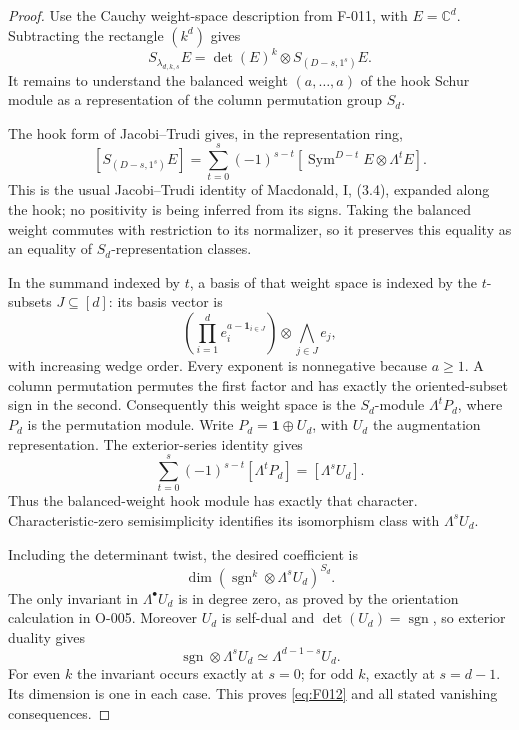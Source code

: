 \begin{proof}
Use the Cauchy weight-space description from F-011, with
\(E=\mathbb C^d\). Subtracting the rectangle \((k^d)\) gives
\[
 S_{\lambda_{d,k,s}}E
       =\det(E)^k\otimes S_{(D-s,1^s)}E.
\]
It remains to understand the balanced weight \((a,\ldots,a)\)
of the hook Schur module as a representation of the column
permutation group \(S_d\).

The hook form of Jacobi--Trudi gives, in the representation ring,
\[
 [S_{(D-s,1^s)}E]
    =\sum_{t=0}^{s}(-1)^{s-t}
       [\operatorname{Sym}^{D-t}E\otimes\Lambda^t E].
\]
This is the usual Jacobi--Trudi identity of Macdonald, I, (3.4),
expanded along the hook; no positivity is being inferred from
its signs. Taking the balanced weight commutes with restriction
to its normalizer, so it preserves this equality as an equality
of \(S_d\)-representation classes.

In the summand indexed by \(t\), a basis of that weight space is
indexed by the \(t\)-subsets \(J\subseteq[d]\): its basis vector is
\[
  \left(\prod_{i=1}^d e_i^{a-\mathbf1_{i\in J}}\right)
                 \otimes\bigwedge_{j\in J}e_j,
\]
with increasing wedge order. Every exponent is nonnegative
because \(a\geq1\). A column permutation permutes the first
factor and has exactly the oriented-subset sign in the second.
Consequently this weight space is the \(S_d\)-module
\(\Lambda^t P_d\), where \(P_d\) is the permutation module.
Write \(P_d=\mathbf1\oplus U_d\), with \(U_d\) the augmentation
representation. The exterior-series identity gives
\[
 \sum_{t=0}^s(-1)^{s-t}[\Lambda^t P_d]
                              =[\Lambda^s U_d].
\]
Thus the balanced-weight hook module has exactly that character.
Characteristic-zero semisimplicity identifies its isomorphism
class with \(\Lambda^s U_d\).

Including the determinant twist, the desired coefficient is
\[
                    \dim(\operatorname{sgn}^k\otimes
                                      \Lambda^s U_d)^{S_d}.
\]
The only invariant in \(\Lambda^\bullet U_d\) is in degree zero,
as proved by the orientation calculation in O-005.
Moreover \(U_d\) is self-dual and
\(\det(U_d)=\operatorname{sgn}\), so exterior duality gives
\[
  \operatorname{sgn}\otimes\Lambda^s U_d
                      \simeq\Lambda^{d-1-s}U_d.
\]
For even \(k\) the invariant occurs exactly at \(s=0\);
for odd \(k\), exactly at \(s=d-1\). Its dimension is one
in each case. This proves \eqref{eq:F012} and all stated
vanishing consequences.
\end{proof}

